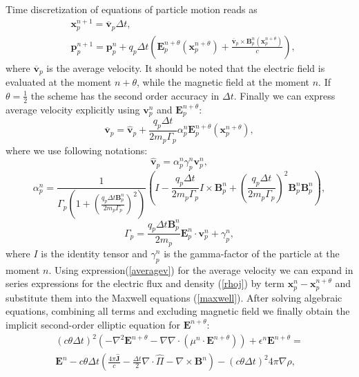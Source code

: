 Time discretization of equations of particle motion reads as
\begin{equation}\label{particlemoving}
\begin{aligned}
&\textbf{x}_p^{n+1}=\overline{\textbf{v}}_p\Delta t,
\\
&\textbf{p}_p^{n+1}=\textbf{p}_p^{n}+q_p\Delta t
\left(\textbf{E}_p^{n+\theta}\left(\textbf{x}_p^{n+\theta}\right)+\frac{\overline{\textbf{v}}_p\times\textbf{B}_p^n\left(\textbf{x}_p^{n+\theta}\right)}{c}\right),
\end{aligned}
\end{equation}
where $\overline{\textbf{v}}_p$ is the average velocity. It should be noted that the electric field is evaluated at the moment $n+\theta$, while the magnetic field at the moment $n$. If $\theta = \frac{1}{2}$ the scheme has the second order accuracy in $\Delta t$.  Finally we can express average velocity explicitly using $\textbf{v}_p^{n}$ and $\textbf{E}_p^{n+\theta}$: 
\begin{equation}\label{averagev}
\overline{\textbf{v}}_p = \widehat{\textbf{v}}_p+\frac{q_p\Delta t}{2m_p\Gamma_p}\alpha_p^{n}\textbf{E}_p^{n+\theta}\left(\textbf{x}_p^{n+\theta}\right),
\end{equation}
where we use following notations:
\begin{equation}
\widehat{\textbf{v}}_p=\alpha_p^{n}\gamma_p^n\textbf{v}_p^n,
\end{equation} 
\begin{equation}
\alpha_p^n=\frac{1}{\Gamma_p\left(1+\left(\frac{q_p\Delta t\textbf{B}_p^n}{2m_p\Gamma_p}\right)^2\right)}\left(I-\frac{q_p\Delta t}{2m_p\Gamma_p}I\times\textbf{B}_p^n+\left(\frac{q_p\Delta t}{2m_p\Gamma_p}\right)^2\textbf{B}_p^n\textbf{B}_p^n\right),
\end{equation}
\begin{equation}
\Gamma_p=\frac{q_p\Delta t\textbf{B}_p^n}{2m_p}\textbf{E}_p^n\cdot\textbf{v}_p^n+\gamma_p^n,
\end{equation}
where $I$ is the identity tensor and $\gamma_p^n$ is the gamma-factor of the particle at the moment $n$. Using expression(\ref{averagev}) for the average velocity we can expand in series expressions for the electric flux and density (\ref{rhoj}) by term $\textbf{x}_p^n-\textbf{x}_p^{n+\theta}$ and substitute them into the Maxwell equations (\ref{maxwell}). After solving algebraic equations, combining all terms and excluding magnetic field we finally obtain the implicit second-order elliptic equation for $\textbf{E}^{n+\theta}$:
\begin{eqnarray}\label{electricfield}
\left(c\theta\Delta t\right)^2 \left(-\nabla^2\textbf{E}^{n+\theta}-\nabla\nabla\cdot\left(\mu^n\cdot\textbf{E}^{n+\theta}\right)\right)+\epsilon^n\textbf{E}^{n+\theta}=
\nonumber\\
\textbf{E}^{n}-c\theta\Delta t\left(\frac{4\pi\widehat{\textbf{J}}}{c}-\frac{\Delta t}{2}\nabla\cdot\widehat{\Pi}-\nabla\times\textbf{B}^n\right)
-\left(c\theta\Delta t\right)^2 4\pi \nabla\widehat{\rho},
\end{eqnarray}
